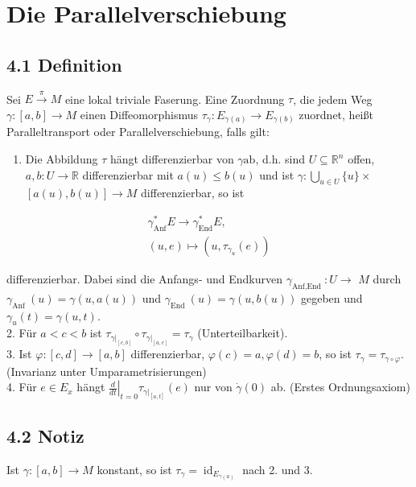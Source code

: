 \documentclass[10pt, letterpaper]{article}
\begin{document}
\pagebreak

\section{Die Parallelverschiebung}
\subsection*{4.1 Definition}
Sei $E \xrightarrow{\pi} M$ eine lokal triviale Faserung. Eine Zuordnung $\tau$, die jedem Weg $\gamma:[a, b] \rightarrow M$ einen Diffeomorphismus $\tau_{\gamma}: E_{\gamma(a)} \rightarrow E_{\gamma(b)}$ zuordnet, heißt Paralleltransport oder Parallelverschiebung, falls gilt:

\begin{enumerate}
  \item Die Abbildung $\tau$ hängt differenzierbar von $\gamma \mathrm{ab}$, d.h. sind $U \subseteq \mathbb{R}^{n}$ offen, $a, b: U \rightarrow \mathbb{R}$ differenzierbar mit $a(u) \leq b(u)$ und ist $\gamma: \bigcup_{u \in U}\{u\} \times$ $[a(u), b(u)] \rightarrow M$ differenzierbar, so ist
\end{enumerate}

$$
\begin{gathered}
\gamma_{\mathrm{Anf}}^{*} E \rightarrow \gamma_{\mathrm{End}}^{*} E, \\
(u, e) \mapsto\left(u, \tau_{\gamma_{u}}(e)\right)
\end{gathered}
$$

differenzierbar. Dabei sind die Anfangs- und Endkurven $\gamma_{\text {Anf,End }}: U \rightarrow$ $M$ durch $\gamma_{\text {Anf }}(u)=\gamma(u, a(u))$ und $\gamma_{\text {End }}(u)=\gamma(u, b(u))$ gegeben und $\gamma_{u}(t)=\gamma(u, t)$.\\
2. Für $a<c<b$ ist $\tau_{\left.\gamma\right|_{[c, b]}} \circ \tau_{\left.\gamma\right|_{[a, c]}}=\tau_{\gamma}$ (Unterteilbarkeit).\\
3. Ist $\varphi:[c, d] \rightarrow[a, b]$ differenzierbar, $\varphi(c)=a, \varphi(d)=b$, so ist $\tau_{\gamma}=\tau_{\gamma \circ \varphi}$. (Invarianz unter Umparametrisierungen)\\
4. Für $e \in E_{x}$ hängt $\left.\frac{d}{d t}\right|_{t=0} \tau_{\left.\gamma\right|_{[a, t]}}(e)$ nur von $\dot{\gamma}(0)$ ab. (Erstes Ordnungsaxiom)

\subsection*{4.2 Notiz}
Ist $\gamma:[a, b] \rightarrow M$ konstant, so ist $\tau_{\gamma}=\operatorname{id}_{E_{\gamma(a)}}$ nach 2. und 3.
\end{document}
